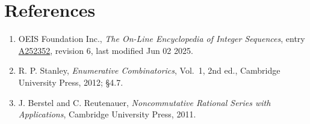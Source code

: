 \documentclass[11pt]{article}
\theoremstyle{definition}
\begin{document}
\section{References}

\begin{enumerate}

\item OEIS Foundation Inc., \emph{The On-Line Encyclopedia of Integer Sequences}, entry \href{https://oeis.org/A252352}{A252352}, revision 6, last modified Jun 02 2025.

\item R. P. Stanley, \emph{Enumerative Combinatorics}, Vol.~1, 2nd ed., Cambridge University Press, 2012; \S4.7.

\item J. Berstel and C. Reutenauer, \emph{Noncommutative Rational Series with Applications}, Cambridge University Press, 2011.

\end{enumerate}
\end{document}
